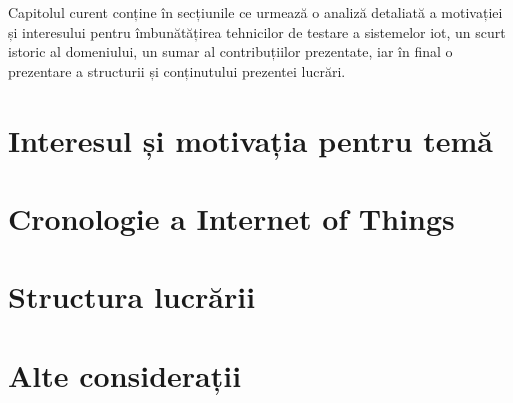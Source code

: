 Capitolul curent conține în secțiunile ce urmează o analiză detaliată a motivației și interesului pentru îmbunătățirea tehnicilor de testare a sistemelor \acrshort{iot}, un scurt istoric al domeniului, un sumar al contribuțiilor prezentate, iar în final o prezentare a structurii și conținutului prezentei lucrări.

\section{Interesul și motivația pentru temă}

\section{Cronologie a Internet of Things}

\section{Structura lucrării}

\section{Alte considerații}